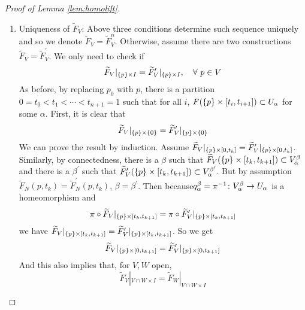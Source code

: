 \begin{enumerate}[label=\arabic{*}.]
\begin{proof}[Proof of Lemma \ref{lem:homolift}]
\begin{enumerate}[label=\Roman*.]
			\item Uniqueness of $\widetilde{F}_V$: Above three conditions determine such sequence uniquely and so we denote $\widetilde{F}_V = \widetilde{F}_V^n$. Otherwise, assume there are two constructions $\widetilde{F}_V = \widetilde{F}_V^\prime$. We only need to check if
			\begin{equation*}
				\widetilde{F}_V|_{\left\{p\right\}\times I} = \widetilde{F}_V^\prime|_{\left\{p\right\}\times I},\quad \forall~p \in V
			\end{equation*}
			As before, by replacing $p_0$ with $p$, there is a partition $0=t_0 < t_1 < \cdots < t_{n+1}=1$ such that for all $i$, $F(\left\{p\right\}\times [t_i,t_{i+1}]) \subset U_{\alpha}$ for some $\alpha$. First, it is clear that
			\begin{equation*}
				\widetilde{F}_V|_{\left\{p\right\}\times \left\{0\right\}} = \widetilde{F}_V^\prime|_{\left\{p\right\}\times \left\{0\right\}}
			\end{equation*}
			We can prove the result by induction. Assume $\widetilde{F}_V|_{\left\{p\right\}\times [0,t_k]} = \widetilde{F}_V^\prime|_{\left\{p\right\}\times [0,t_k]}$. Similarly, by connectedness, there is a $\beta$ such that $\widetilde{F}_V(\left\{p\right\}\times [t_k,t_{k+1}]) \subset V_\alpha^\beta$ and there is a $\beta^\prime$ such that $\widetilde{F}^\prime_V(\left\{p\right\}\times [t_k,t_{k+1}]) \subset V_\alpha^{\beta^\prime}$. But by assumption $\tilde{F}_N\left(p, t_k\right)=\tilde{F}_N^{\prime}\left(p, t_k\right)$, $\beta = \beta^\prime$. Then because$q_{\alpha}^\beta = \pi^{-1} \colon V_{\alpha}^\beta \rightarrow U_\alpha$ is a homeomorphism and
			\begin{equation*}
				\pi \circ \widetilde{F}_V|_{\left\{p\right\}\times [t_k,t_{k+1}]} = \pi \circ \widetilde{F}^\prime_V|_{\left\{p\right\}\times [t_k,t_{k+1}]}
			\end{equation*}
			we have $\widetilde{F}_V|_{\left\{p\right\}\times [t_k,t_{k+1}]} = \widetilde{F}^\prime_V|_{\left\{p\right\}\times [t_k,t_{k+1}]}$. So we get
			\begin{equation*}
				\widetilde{F}_V|_{\left\{p\right\}\times [0,t_{k+1}]} = \widetilde{F}^\prime_V|_{\left\{p\right\}\times [0,t_{k+1}]}
			\end{equation*}
			And this also implies that, for $V,W$ open,
			\begin{equation*}
				\widetilde{F}_V|_{V\cap W \times I} = \widetilde{F}_W|_{V\cap W \times I}
			\end{equation*}


\end{enumerate}
\end{proof}
\end{enumerate}
